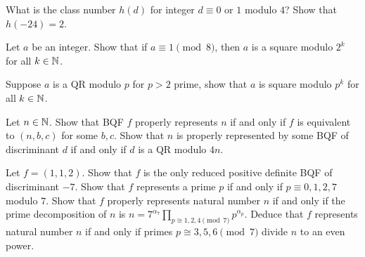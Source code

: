 \begin{question}{20}
	What is the class number $h(d)$ for integer $d \equiv 0$ or $1$ modulo $4$? Show that $h(-24) = 2$.
\end{question}

\begin{question}{20.5}
	Let $a$ be an integer. Show that if $a \equiv 1 \pmod{8}$, then $a$ is a square modulo $2^k$ for all $k \in \mathbb{N}$.
	
	Suppose $a$ is a QR modulo $p$ for $p>2$ prime, show that $a$ is square modulo $p^k$ for all $k\in \mathbb{N}$.
\end{question}

\begin{question}{21}
	Let $n \in \mathbb{N}$. Show that BQF $f$ properly represents $n$ if and only if $f$ is equivalent to $(n,b,c)$ for some $b,c$. Show that $n$ is properly represented by some BQF of discriminant $d$ if and only if $d$ is a QR modulo $4n$.
	
	Let $f = (1,1,2)$. Show that $f$ is the only reduced positive definite BQF of discriminant $-7$. Show that $f$ represents a prime $p$ if and only if $p \equiv 0,1,2,7$ modulo $7$. 
	Show that $f$ properly represents natural number $n$ if and only if the prime decomposition of $n$ is $n = 7^{\alpha_7} \prod_{p \cong 1,2,4 \pmod{7}} p^{\alpha_p}$.
	Deduce that $f$ represents natural number $n$ if and only if primes $p \cong 3,5,6 \pmod{7}$ divide $n$ to an even power.
\end{question}
